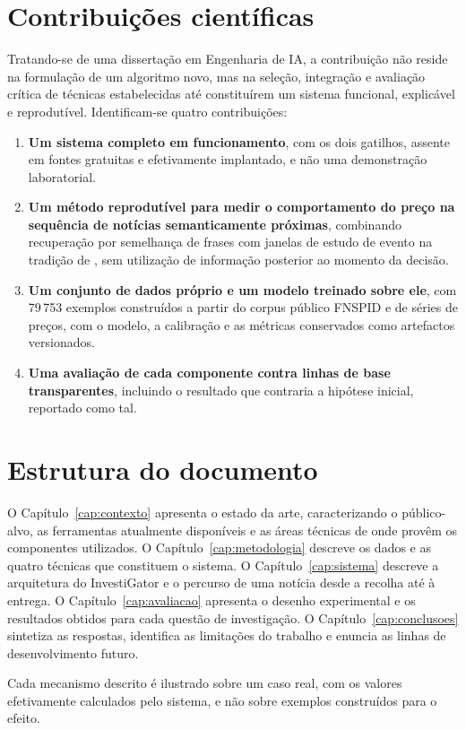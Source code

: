 \section{Contribuições científicas}
\label{sec:intro_contribuicoes}

Tratando-se de uma dissertação em Engenharia de \gls{IA}, a contribuição não reside na formulação
de um algoritmo novo, mas na seleção, integração e avaliação crítica de técnicas estabelecidas até
constituírem um sistema funcional, explicável e reprodutível. Identificam-se quatro contribuições:

\begin{enumerate}
  \item \textbf{Um sistema completo em funcionamento}, com os dois gatilhos, assente em fontes
        gratuitas e efetivamente implantado, e não uma demonstração laboratorial.
  \item \textbf{Um método reprodutível para medir o comportamento do preço na sequência de
        notícias semanticamente próximas}, combinando recuperação por semelhança de frases
        \autocite{reimers2019sbert} com janelas de estudo de evento na tradição de
        \textcite{brown1985daily}, sem utilização de informação posterior ao momento da decisão.
  \item \textbf{Um conjunto de dados próprio e um modelo treinado sobre ele}, com 79\,753 exemplos
        construídos a partir do corpus público \gls{FNSPID} \autocite{dong2024fnspid} e de séries
        de preços, com o modelo, a calibração e as métricas conservados como artefactos
        versionados.
  \item \textbf{Uma avaliação de cada componente contra linhas de base transparentes}, incluindo o
        resultado que contraria a hipótese inicial, reportado como tal.
\end{enumerate}

\section{Estrutura do documento}
\label{sec:intro_estrutura}

O Capítulo~\ref{cap:contexto} apresenta o estado da arte, caracterizando o público-alvo, as
ferramentas atualmente disponíveis e as áreas técnicas de onde provêm os componentes utilizados.
O Capítulo~\ref{cap:metodologia} descreve os dados e as quatro técnicas que constituem o sistema.
O Capítulo~\ref{cap:sistema} descreve a arquitetura do InvestiGator e o percurso de uma notícia
desde a recolha até à entrega. O Capítulo~\ref{cap:avaliacao} apresenta o desenho experimental e
os resultados obtidos para cada questão de investigação. O Capítulo~\ref{cap:conclusoes} sintetiza
as respostas, identifica as limitações do trabalho e enuncia as linhas de desenvolvimento futuro.

Cada mecanismo descrito é ilustrado sobre um caso real, com os valores efetivamente calculados
pelo sistema, e não sobre exemplos construídos para o efeito.
